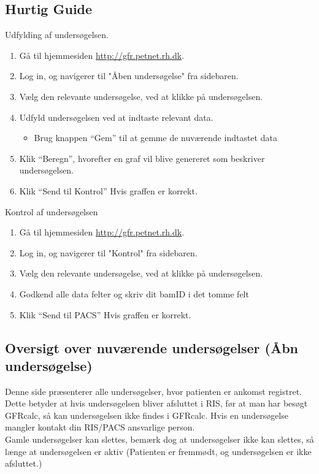 \documentclass{article}
\begin{document}
\subsection{Hurtig Guide}
Udfylding af undersøgelsen.
\begin{enumerate}
	\item Gå til hjemmesiden \url{http://gfr.petnet.rh.dk}.
	\item Log in, og navigerer til "Åben undersøgelse" fra sidebaren. 
	\item Vælg den relevante undersøgelse, ved at klikke på undersøgelsen.
	\item Udfyld undersøgelsen ved at indtaste relevant data.
	\begin{itemize}
		\item Brug knappen “Gem” til at gemme de nuværende indtastet data
	\end{itemize}
	\item Klik “Beregn”, hvorefter en graf vil blive genereret som beskriver undersøgelsen.
	\item Klik “Send til Kontrol” Hvis graffen er korrekt.
\end{enumerate} 
Kontrol af undersøgelsen 
\begin{enumerate}
	\item Gå til hjemmesiden \url{http://gfr.petnet.rh.dk}.
	\item Log in, og navigerer til "Kontrol" fra sidebaren. 
	\item Vælg den relevante undersøgelse, ved at klikke på undersøgelsen.
	\item Godkend alle data felter og skriv dit bamID i det tomme felt
	\item Klik “Send til PACS” Hvis graffen er korrekt.
\end{enumerate} 

\subsection{Oversigt over nuværende undersøgelser (Åbn undersøgelse)}\label{list_study}
Denne side præsenterer alle undersøgelser, hvor patienten er ankomst registret. Dette betyder at hvis undersøgelsen bliver afsluttet i RIS, før at man har besøgt GFRcalc, så kan undersøgelsen ikke findes i GFRcalc. Hvis en undersøgelse mangler kontakt din RIS/PACS ansvarlige person. \\

Gamle undersøgelser kan slettes, bemærk dog at undersøgelser ikke kan slettes, så længe at undersøgelsen er aktiv (Patienten er fremmødt, og undersøgelsen er ikke afsluttet.) \\
\end{document}
